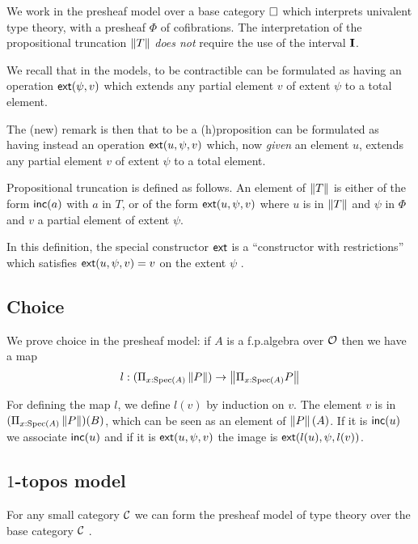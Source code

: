     We work in the presheaf model over a base category $\square$ which interprets univalent type theory,
    with a presheaf $\Phi$ of cofibrations. The interpretation of the propositional
    truncation $\left\lVert T \right\rVert$ {\em does not} require the use of the interval $\mathbf{I}$.

    We recall that in the models, to be contractible can be formulated as having an operation
    $\mathsf{ext}(\psi,v)$ which extends any partial element $v$ of extent $\psi$ to a total element.

    The (new) remark is then that to be a (h)proposition can be formulated as having instead
    an operation $\mathsf{ext}(u,\psi,v)$ which, now {\em given}
    an element $u$, extends any partial element $v$ of extent $\psi$ to a total element.

\medskip    

Propositional truncation is defined as follows. An element of $\left\lVert T \right\rVert$ is either of the form
$\mathsf{inc}(a)$ with $a$ in $T$, or of the form $\mathsf{ext}(u,\psi,v)$ where $u$ is in $\left\lVert T \right\rVert$ and $\psi$
in $\Phi$ and $v$ a partial element of extent $\psi$.

In this definition, the special constructor $\mathsf{ext}$ is a ``constructor with restrictions'' which
satisfies $\mathsf{ext}(u,\psi,v) = v$ on the extent $\psi$ \cite{CoquandHM18}.

\subsection{Choice}

We prove choice in the presheaf model: if $A$ is a f.p.\@ algebra over $\mathcal O$ then we have a map
$$
l:(\Pi_{x:\operatorname{Spec}(A)}\left\lVert P \right\rVert)\rightarrow \left\lVert \Pi_{x:\operatorname{Spec}(A)}P \right\rVert
$$

For defining the map $l$, we define $l(v)$ by induction on $v$.
The element $v$ is in $(\Pi_{x:\operatorname{Spec}(A)}\left\lVert P \right\rVert)(B)$, which can be seen as
an element of $\left\lVert P \right\rVert(A)$. If it is $\mathsf{inc}(u)$ we associate $\mathsf{inc}(u)$ and 
if it is $\mathsf{ext}(u,\psi,v)$ the image is $\mathsf{ext}(l(u),\psi,l(v))$.

\subsection{$1$-topos model}

For any small category $\mathcal{C}$ we can form the presheaf model of type theory over the base category $\mathcal{C}$ \cite{hofmann,huber-phd-thesis}.

\medskip

